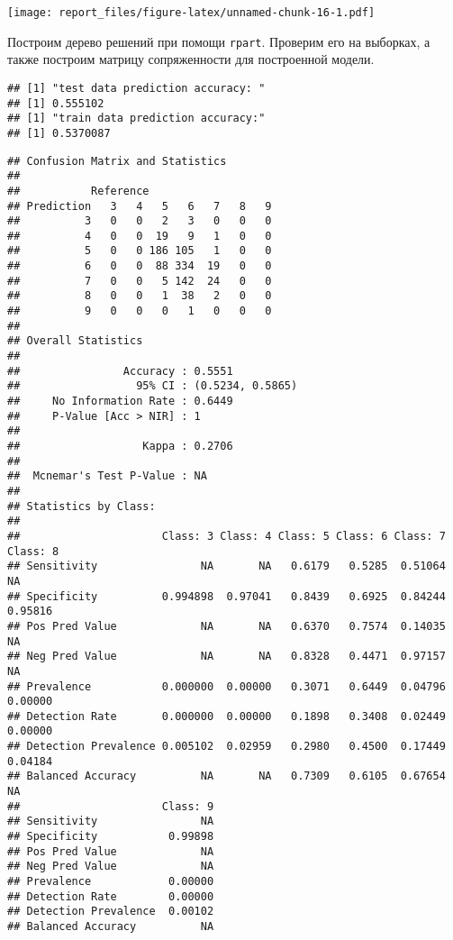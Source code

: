 \documentclass[
]{article}
\newenvironment{Shaded}{\begin{snugshade}}{\end{snugshade}}
\newcommand{\KeywordTok}[1]{\textcolor[rgb]{0.13,0.29,0.53}{\textbf{#1}}}
\newcommand{\NormalTok}[1]{#1}
\newcommand{\OperatorTok}[1]{\textcolor[rgb]{0.81,0.36,0.00}{\textbf{#1}}}
\newcommand{\StringTok}[1]{\textcolor[rgb]{0.31,0.60,0.02}{#1}}
\begin{document}
\texttt{[image: report\_files/figure-latex/unnamed-chunk-16-1.pdf]}

Построим дерево решений при помощи \texttt{rpart}. Проверим его на
выборках, а также построим матрицу сопряженности для построенной модели.

\begin{Shaded}
\end{Shaded}

\begin{verbatim}
## [1] "test data prediction accuracy: "
## [1] 0.555102
## [1] "train data prediction accuracy:"
## [1] 0.5370087
\end{verbatim}

\begin{verbatim}
## Confusion Matrix and Statistics
## 
##           Reference
## Prediction   3   4   5   6   7   8   9
##          3   0   0   2   3   0   0   0
##          4   0   0  19   9   1   0   0
##          5   0   0 186 105   1   0   0
##          6   0   0  88 334  19   0   0
##          7   0   0   5 142  24   0   0
##          8   0   0   1  38   2   0   0
##          9   0   0   0   1   0   0   0
## 
## Overall Statistics
##                                           
##                Accuracy : 0.5551          
##                  95% CI : (0.5234, 0.5865)
##     No Information Rate : 0.6449          
##     P-Value [Acc > NIR] : 1               
##                                           
##                   Kappa : 0.2706          
##                                           
##  Mcnemar's Test P-Value : NA              
## 
## Statistics by Class:
## 
##                      Class: 3 Class: 4 Class: 5 Class: 6 Class: 7 Class: 8
## Sensitivity                NA       NA   0.6179   0.5285  0.51064       NA
## Specificity          0.994898  0.97041   0.8439   0.6925  0.84244  0.95816
## Pos Pred Value             NA       NA   0.6370   0.7574  0.14035       NA
## Neg Pred Value             NA       NA   0.8328   0.4471  0.97157       NA
## Prevalence           0.000000  0.00000   0.3071   0.6449  0.04796  0.00000
## Detection Rate       0.000000  0.00000   0.1898   0.3408  0.02449  0.00000
## Detection Prevalence 0.005102  0.02959   0.2980   0.4500  0.17449  0.04184
## Balanced Accuracy          NA       NA   0.7309   0.6105  0.67654       NA
##                      Class: 9
## Sensitivity                NA
## Specificity           0.99898
## Pos Pred Value             NA
## Neg Pred Value             NA
## Prevalence            0.00000
## Detection Rate        0.00000
## Detection Prevalence  0.00102
## Balanced Accuracy          NA
\end{verbatim}
\end{document}
